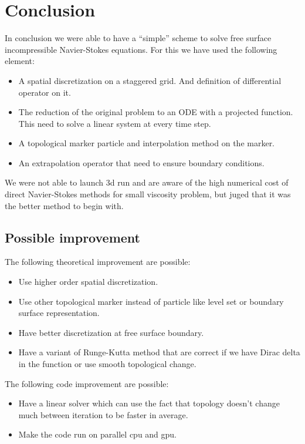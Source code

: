 \chapter{Conclusion}

In conclusion we were able to have a ``simple'' scheme to solve free surface incompressible 
Navier-Stokes equations.
For this we have used the following element:
\begin{itemize}
 \item A spatial discretization on a staggered grid. And definition of differential operator on it.
 \item The reduction of the original problem to an ODE with a projected function.
 This need to solve a linear system at every time step.
 \item A topological marker particle and interpolation method on the marker.
 \item An extrapolation operator that need to ensure boundary conditions.
\end{itemize}

We were not able to launch 3d run and are aware of the high numerical cost of direct Navier-Stokes
methods for small viscosity problem, but juged that it was the better method to begin with.
\section{Possible improvement}

The following theoretical improvement are possible:
\begin{itemize}
 \item Use higher order spatial discretization.
 \item Use other topological marker instead of particle like level set or boundary surface representation.
 \item Have better discretization at free surface boundary.
 \item Have a variant of Runge-Kutta method that are correct if we have Dirac delta in the function 
 or use smooth topological change.
\end{itemize}

The following code improvement are possible:
\begin{itemize}
 \item Have a linear solver which can use the fact that topology doesn't change much between iteration
 to be faster in average.
 \item Make the code run on parallel cpu and gpu.
\end{itemize}

